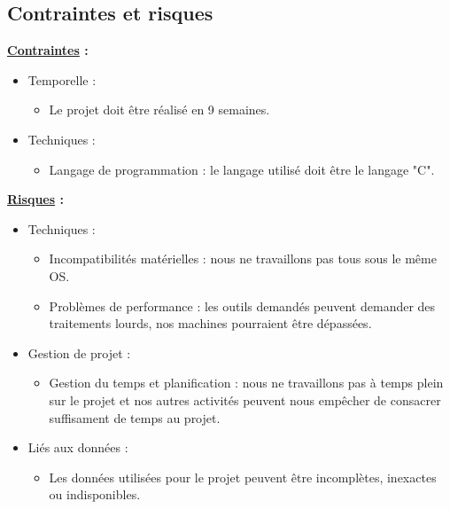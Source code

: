 \documentclass[a4paper, 12pt]{report}
\begin{document}
\subsection{Contraintes et risques}

\textbf{\underline{Contraintes} :}
\begin{itemize}
    \item Temporelle :
          \begin{itemize}
              \item Le projet doit être réalisé en 9 semaines.
          \end{itemize}
    \item Techniques :
          \begin{itemize}
              \item Langage de programmation : le langage utilisé doit être le langage "C".
          \end{itemize}
\end{itemize}
\bigskip

\textbf{\underline{Risques} :}
\begin{itemize}
    \item Techniques :
          \begin{itemize}
              \item Incompatibilités matérielles : nous ne travaillons pas tous sous le même OS.
              \item Problèmes de performance : les outils demandés peuvent demander des traitements lourds, nos machines pourraient être dépassées.
          \end{itemize}
    \item Gestion de projet :
          \begin{itemize}
              \item Gestion du temps et planification : nous ne travaillons pas à temps plein sur le projet et nos autres activités peuvent nous empêcher de consacrer suffisament de temps au projet.
          \end{itemize}
    \item Liés aux données :
          \begin{itemize}
              \item Les données utilisées pour le projet peuvent être incomplètes, inexactes ou indisponibles.
          \end{itemize}
\end{itemize}
\bigskip
\end{document}

